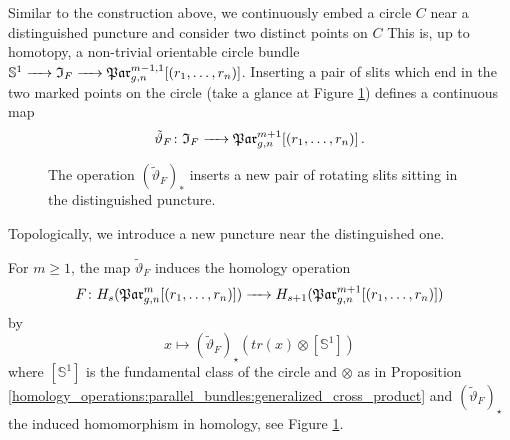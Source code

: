 Similar to the construction above, we continuously embed a circle $C$ near a distinguished puncture and consider two distinct points on $C$
This is, up to homotopy, a non-trivial orientable circle bundle $\mathbb S^1 \to \mathfrak I_F \to \Par_{g,n}^{m-1,1}[(r_1, \ldots, r_n)]$.
Inserting a pair of slits which end in the two marked points on the circle (take a glance at Figure \ref{homology_operations:parallel_bundles:operation_f}) defines a continuous map
\label{page:operation_map_f}%
\[
    \tilde\vartheta_F \colon \mathfrak I_F \to \Par_{g,n}^{m+1}[(r_1, \ldots, r_n)] \,.
\]
\begin{figure}[ht]
    \centering
    \caption{\label{homology_operations:parallel_bundles:operation_f}%
        The operation $(\tilde\vartheta_F)_\ast$ inserts a new pair of rotating slits sitting in the distinguished puncture.}
\end{figure}
Topologically, we introduce a new puncture near the distinguished one.
\begin{defi}
    \label{homology_operations:parallel_bundles:def_operation_f}
    For $m \ge 1$, the map $\tilde\vartheta_F$ induces the homology operation
    \[
        F \colon H_s(\Par_{g,n}^m[(r_1, \ldots, r_n)]) \to H_{s+1}(\Par_{g,n}^{m+1}[(r_1, \ldots, r_n)])
    \]
    by
    \[
        x \mapsto (\tilde\vartheta_F)_\star( tr(x) \otimes [\mathbb S^1])
    \]
    where $[\mathbb S^1]$ is the fundamental class of the circle and $\otimes$ as in Proposition \ref{homology_operations:parallel_bundles:generalized_cross_product}
    and $(\tilde\vartheta_F)_\star$ the induced homomorphism in homology, see Figure \ref{homology_operations:parallel_bundles:operation_f}.
\end{defi}

